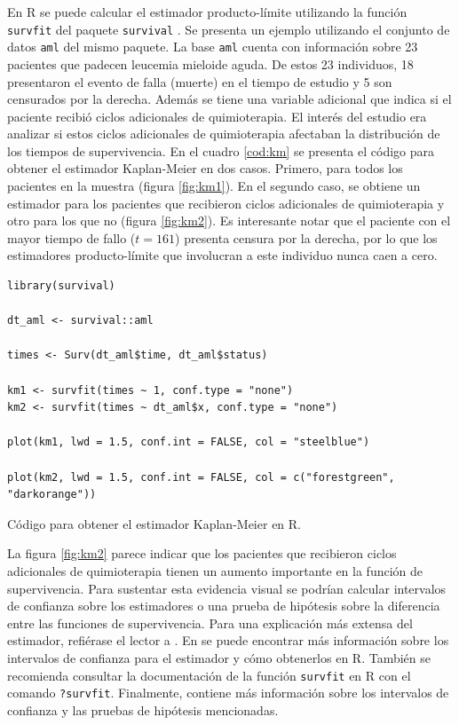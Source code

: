 \documentclass[11pt,a4paper]{article}
\begin{document}
 En R se puede calcular el estimador producto-límite utilizando la función \texttt{survfit} del paquete \texttt{survival} \citep{survival-book}. Se presenta un ejemplo utilizando el conjunto de datos \texttt{aml} del mismo paquete. La base \texttt{aml} cuenta con información sobre 23 pacientes que padecen leucemia mieloide aguda. De estos 23 individuos, 18 presentaron el evento de falla (muerte) en el tiempo de estudio y 5 son censurados por la derecha. Además se tiene una variable adicional que indica si el paciente recibió ciclos adicionales de quimioterapia. El interés del estudio era analizar si estos ciclos adicionales de quimioterapia afectaban la distribución de los tiempos de supervivencia. En el cuadro \ref{cod:km} se presenta el código para obtener el estimador Kaplan-Meier en dos casos. Primero, para todos los pacientes en la muestra (figura \ref{fig:km1}). En el segundo caso, se obtiene un estimador para los pacientes que recibieron ciclos adicionales de quimioterapia y otro para los que no (figura \ref{fig:km2}). Es interesante notar que el paciente con el mayor tiempo de fallo ($t = 161$) presenta censura por la derecha, por lo que los estimadores producto-límite que involucran a este individuo nunca caen a cero.

\begin{table}[htb]
\begin{lstlisting}
library(survival)

dt_aml <- survival::aml

times <- Surv(dt_aml$time, dt_aml$status)

km1 <- survfit(times ~ 1, conf.type = "none")
km2 <- survfit(times ~ dt_aml$x, conf.type = "none")

plot(km1, lwd = 1.5, conf.int = FALSE, col = "steelblue")

plot(km2, lwd = 1.5, conf.int = FALSE, col = c("forestgreen", "darkorange"))
\end{lstlisting}
\caption{Código para obtener el estimador Kaplan-Meier en R.}
\label{cod:km}
\end{table}

La figura \ref{fig:km2} parece indicar que los pacientes que recibieron ciclos adicionales de quimioterapia tienen un aumento importante en la función de supervivencia. Para sustentar esta evidencia visual se podrían calcular intervalos de confianza sobre los estimadores o una prueba de hipótesis sobre la diferencia entre las funciones de supervivencia. Para una explicación más extensa del estimador, refiérase el lector a \citet{kaplan-meier}. En \citet{moore} se puede encontrar más información sobre los intervalos de confianza para el estimador y cómo obtenerlos en R. También se recomienda consultar la documentación de la función \texttt{survfit} en R con el comando \texttt{?survfit}. Finalmente, \citet{klein} contiene más información sobre los intervalos de confianza y las pruebas de hipótesis mencionadas.
\end{document}
